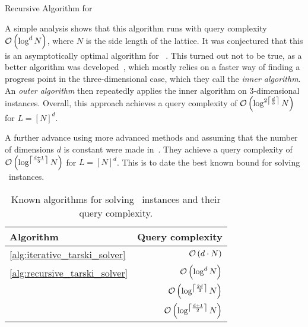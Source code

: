 \begin{algorithm}
	\caption{Recursive Algorithm for \Tarski}\label{alg:recursive_tarski_solver}
\end{algorithm}

A simple analysis shows that this algorithm runs with query complexity $\mathcal{O}\left(\log^{d}{N}\right)$, where $N$ is the side length of the lattice. It was conjectured that this is an asymptotically optimal algorithm for \Tarski~. This turned out not to be true, as a better algorithm was developed~, which mostly relies on a faster way of finding a progress point in the three-dimensional case, which they call the \emph{inner algorithm}. An \emph{outer algorithm} then repeatedly applies the inner algorithm on 3-dimensional instances. Overall, this approach achieves a query complexity of $\mathcal{O}\left(\log^{2\left\lceil\frac{d}{3}\right\rceil}{N}\right)$ for $L = {[N]}^d$.

A further advance using more advanced methods and assuming that the number of dimensions $d$ is constant were made in~. They achieve a query complexity of $\mathcal{O}\left(\log^{\left\lceil\frac{d+1}{2}\right\rceil}{N}\right)$ for $L = {[N]}^d$. This is to date the best known bound for solving \Tarski\ instances.

\begin{table}
	\centering
	\begin{tabular}{@{}l r@{}}
		\toprule
		\textbf{Algorithm}                 & \textbf{Query complexity}               \\
		\midrule
		\cref{alg:iterative_tarski_solver} & $\mathcal{O}\left(d \cdot N\right)$                      \\
		\cref{alg:recursive_tarski_solver} & $\mathcal{O}\left(\log^{d}{N}\right)$                    \\
		\textcite{fearnley_faster_2022}    & $\mathcal{O}\left(\log^{\left\lceil\frac{2d}{3}\right\rceil}{N}\right)$  \\
		\textcite{chen_improved_2022}      & $\mathcal{O}\left(\log^{\left\lceil\frac{d+1}{2}\right\rceil}{N}\right)$ \\
		\bottomrule
	\end{tabular}
	\caption[Known algorithms for solving \Tarski]{Known algorithms for solving \Tarski\ instances and their query complexity.}\label{tab:tarski_algorithms}
\end{table}



